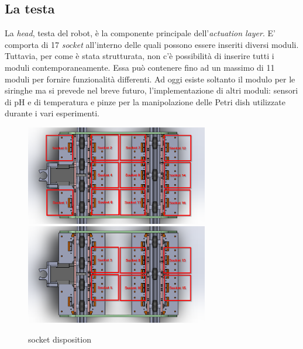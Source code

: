\subsection{La testa}
La \emph{head}, testa del robot, è la componente principale dell'\emph{actuation layer}. E' comporta di 17 \emph{socket} all'interno delle quali possono essere inseriti diversi moduli. Tuttavia, per come è stata strutturata, non c'è possibilità di inserire tutti i moduli contemporaneamente. Essa può contenere fino ad un massimo di 11 moduli per fornire funzionalità differenti. Ad oggi esiste soltanto il modulo per le siringhe ma si prevede nel breve futuro, l'implementazione di altri moduli: sensori di pH e di temperatura e pinze per la manipolazione delle Petri dish utilizzate durante i vari esperimenti. 
	\begin{figure}[h]
	\centering
   		{\includegraphics[width=8cm]{immagini/head_sockets_1.png}}
 	\hspace{5mm}
   		{\includegraphics[width=8cm]{immagini/head_sockets.png}}
	\caption{socket disposition}
 	\end{figure}


